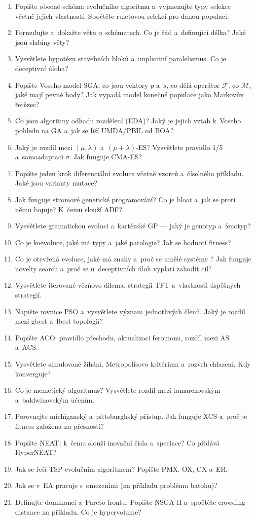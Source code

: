 \documentclass[11pt,a4paper]{article}
\theoremstyle{definition}
\begin{document}
\begin{enumerate}
\item Popište obecné schéma evolučního algoritmu a~vyjmenujte typy selekce
  včetně jejich vlastností. Spočtěte ruletovou selekci pro danou populaci.
\item Formulujte a~dokažte větu o~schématech. Co je řád a~definující délka?
  Jaké jsou slabiny věty?
\item Vysvětlete hypotézu stavebních bloků a~implicitní paralelismus.
  Co je deceptivní úloha?
\item Popište Voseho model SGA: co jsou vektory $p$ a~$s$, co dělá operátor
  $\mathcal{F}$, co $\mathcal{M}$, jaké mají pevné body? Jak vypadá model
  konečné populace jako Markovův řetězec?
\item Co jsou algoritmy odhadu rozdělení (EDA)? Jaký je jejich vztah
  k~Voseho pohledu na GA a~jak se liší UMDA/PBIL od BOA?
\item Jaký je rozdíl mezi $(\mu,\lambda)$ a~$(\mu+\lambda)$-ES?
  Vysvětlete pravidlo 1/5 a~samoadaptaci $\sigma$. Jak funguje CMA-ES?
\item Popište jeden krok diferenciální evoluce včetně vzorců
  a~číselného příkladu. Jaké jsou varianty mutace?
\item Jak funguje stromové genetické programování? Co je bloat a~jak se proti
  němu bojuje? K~čemu slouží ADF?
\item Vysvětlete gramatickou evoluci a~kartézské GP --- jaký je genotyp
  a~fenotyp?
\item Co je koevoluce, jaké má typy a~jaké patologie? Jak se hodnotí fitness?
\item Co je otevřená evoluce, jaké má znaky a~proč se umělé systémy
  ? Jak funguje novelty search a~proč se u~deceptivních úloh
  vyplatí zahodit cíl?
\item Vysvětlete iterované vězňovo dilema, strategii TFT a~vlastnosti
  úspěšných strategií.
\item Napište rovnice PSO a~vysvětlete význam jednotlivých členů.
  Jaký je rozdíl mezi gbest a~lbest topologií?
\item Popište ACO: pravidlo přechodu, aktualizaci feromonu, rozdíl mezi
  AS a~ACS.
\item Vysvětlete simulované žíhání, Metropolisovo kritérium a~rozvrh chlazení.
  Kdy konverguje?
\item Co je memetický algoritmus? Vysvětlete rozdíl mezi lamarckovským
  a~baldwinovským učením.
\item Porovnejte michiganský a~pittsburghský přístup. Jak funguje XCS a~proč
  je fitness založena na přesnosti?
\item Popište NEAT: k~čemu slouží inovační čísla a~speciace?
  Co přidává HyperNEAT?
\item Jak se řeší TSP evolučním algoritmem? Popište PMX, OX, CX a~ER.
\item Jak se v~EA pracuje s~omezeními (na příkladu problému batohu)?
\item Definujte dominanci a~Pareto frontu. Popište NSGA-II a~spočtěte
  crowding distance na příkladu. Co je hypervolume?
\end{enumerate}
\end{document}
